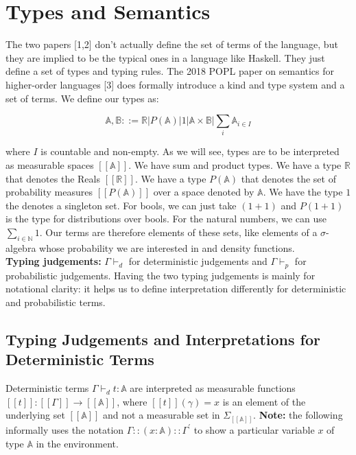 \documentclass[11pt]{article}
\theoremstyle{definition}
\theoremstyle{plain}
\renewcommand{\b}[1]{\mathbb{#1}}
\begin{document}
\section{Types and Semantics}

\noindent The two papers [1,2] don't actually define the set of terms of the language,
but they are implied to be the typical ones in a language like Haskell. They just define
a set of types and typing rules. The 2018 POPL paper on semantics for higher-order languages [3] 
does formally introduce a kind and type system and a set of terms. We define our types as:

$$ \b{A},\b{B} ::= 
    \b{R} | P(\b{A}) | 1 | \b{A} \times \b{B} | \sum_i \b{A}_{i \in I} $$

\noindent where $I$ is countable and non-empty. As we will see, 
types are to be interpreted as measurable spaces $[[\b{A}]]$. 
We have sum and product types. We have a type $\b{R}$ that denotes the Reals $[[\b{R}]]$. 
We have a type $P(\b{A})$ that denotes the set of probability measures $[[P(\b{A})]]$
over a space denoted by $\b{A}$. We have the type $1$ the denotes a singleton set. 
For bools, we can just take $(1+1)$ and $P(1+1)$ is the type for distributions over bools.
For the natural numbers, we can use $\sum_{i \in \b{N}} 1$. Our terms are therefore
elements of these sets, like elements of a $\sigma$-algebra whose probability
we are interested in and density functions. \\

\noindent \textbf{Typing judgements:} $\Gamma \vdash_d$ for deterministic
judgements and $\Gamma \vdash_p$ for probabilistic judgements. Having the two
typing judgements is mainly for notational clarity: it helps us to define 
interpretation differently for deterministic and probabilistic terms. \\


\subsection{Typing Judgements and Interpretations for Deterministic Terms}

\noindent Deterministic terms  $\Gamma \vdash_d t : \b{A}$ are interpreted
as measurable functions $[[t]]: [[\Gamma]] \rightarrow [[\b{A}]]$,
where $[[t]](\gamma) = x$ is an element of the underlying set
$[[\b{A}]]$ and not a measurable set in $\Sigma_{[[\b{A}]]}$.
\textbf{Note:} the following informally uses the notation 
$\Gamma::(x:\b{A})::\Gamma^\prime$ to show a particular variable $x$
of type $\b{A}$ in the environment.
\end{document}
